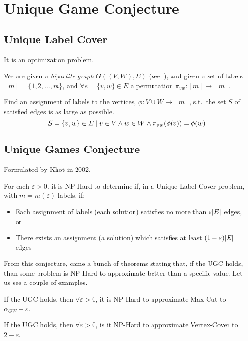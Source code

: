 \section{Unique Game Conjecture}

\subsection{Unique Label Cover}

    It is an optimization problem.

    We are given a \textit{bipartite graph} $G((V,W), E)$ (see~), and given a set of labels $[m] = \{1, 2, \dots, m\}$, and $\forall e = \{ v,w \} \in E$ a permutation $\pi_{vw} : [m] \rightarrow [m]$.

    Find an assignment of labels to the vertices, $\phi : V \cup W \rightarrow [m]$, s.t.~the set $S$ of satisfied edges is as large as possible.
    \[ S = \{ v,w \} \in E \; \vert \; v \in V \wedge w \in W \wedge \pi_{vw}(\phi(v)) = \phi(w) \]

\subsection{Unique Games Conjecture}
    Formulated by Khot in 2002.

    For each $\varepsilon > 0$, it is NP-Hard to determine if, in a Unique Label Cover problem, with $m = m(\varepsilon)$ labels, if:
    \begin{itemize}
        \item Each assignment of labels (each solution) satisfies no more than $\varepsilon \vert E \vert$ edges, or
        \item There exists an assignment (a solution) which satisfies at least $(1-\varepsilon) \vert E \vert$ edges
    \end{itemize}

    From this conjecture, came a bunch of theorems stating that, if the UGC holds, than some problem is NP-Hard to approximate better than a specific value. Let us see a couple of examples.

    \begin{theorem}
        If the UGC holds, then $\forall \varepsilon > 0$, it is NP-Hard to approximate Max-Cut to $\alpha_{GW} - \varepsilon$.
    \end{theorem}

    \begin{theorem}
        If the UGC holds, then $\forall \varepsilon > 0$, is it NP-Hard to approximate Vertex-Cover to $2 - \varepsilon$.
    \end{theorem}


